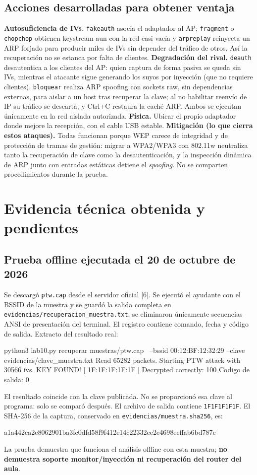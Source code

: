 \documentclass[11pt,a4paper]{article}
\begin{document}
\subsection*{Acciones desarrolladas para obtener ventaja}
\textbf{Autosuficiencia de IVs.} \texttt{fakeauth} asocia el adaptador al AP;
\texttt{fragment} o \texttt{chopchop} obtienen keystream aun con la red casi vacía
y \texttt{arpreplay} reinyecta un ARP forjado para producir miles de IVs sin
depender del tráfico de otros. Así la recuperación no se estanca por falta de
clientes.
\textbf{Degradación del rival.} \texttt{deauth} desautentica a los clientes del AP:
quien captura de forma pasiva se queda sin IVs, mientras el atacante sigue generando
los suyos por inyección (que no requiere clientes). \texttt{bloquear} realiza ARP
spoofing con sockets raw, sin dependencias externas, para aislar a un host tras
recuperar la clave; al no habilitar reenvío de IP su tráfico se descarta, y Ctrl+C
restaura la caché ARP. Ambos se ejecutan únicamente en la red aislada autorizada.
\textbf{Física.} Ubicar el propio adaptador donde mejore la recepción, con el cable
USB estable.
\textbf{Mitigación (lo que cierra estos ataques).} Todas funcionan porque WEP carece
de integridad y de protección de tramas de gestión: migrar a WPA2/WPA3 con 802.11w
neutraliza tanto la recuperación de clave como la desautenticación, y la inspección
dinámica de ARP junto con entradas estáticas detiene el \textit{spoofing}. No se
comparten procedimientos durante la prueba.

\newpage
\section{Evidencia técnica obtenida y pendientes}
\subsection*{Prueba offline ejecutada el 20 de octubre de 2026}
Se descargó \texttt{ptw.cap} desde el servidor oficial [6]. Se ejecutó el
ayudante con el BSSID de la muestra y se guardó la salida completa en
\texttt{evidencias/recuperacion\_muestra.txt}; se eliminaron únicamente secuencias
ANSI de presentación del terminal. El registro contiene comando, fecha y código
de salida. Extracto del resultado real:
\begin{comandos}
python3 lab10.py recuperar muestras/ptw.cap \
  --bssid 00:12:BF:12:32:29 --clave evidencias/clave_muestra.txt
Read 65282 packets.
Starting PTW attack with 30566 ivs.
KEY FOUND! [ 1F:1F:1F:1F:1F ]
Decrypted correctly: 100%
Codigo de salida: 0
\end{comandos}
El resultado coincide con la clave publicada. No se proporcionó esa clave al
programa: solo se comparó después. El archivo de salida contiene
\texttt{1F1F1F1F1F}. El SHA-256 de la captura, conservado en
\texttt{evidencias/muestra.sha256}, es:
\begin{comandos}
a1a442ca2e8062901ba3fc0dfd58f9f412e14c22332ee2e4698eeffab6bd787c
\end{comandos}
La prueba demuestra que funciona el análisis offline con esta muestra;
\textbf{no demuestra soporte monitor/inyección ni recuperación del router del aula}.
\end{document}
